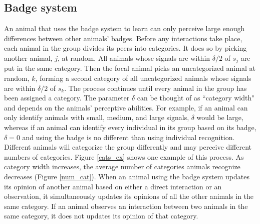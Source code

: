 \subsection{Badge system }
An animal that uses the badge system to learn can only perceive large enough differences between other animals' badges. Before any interactions take place, each animal in the group divides its peers into categories. It does so by picking another animal, $j$, at random. All animals whose signals are within $\delta/2$ of $s_j$ are put in the same category. Then the focal animal picks an uncategorized animal at random, $k$, forming a second category of all uncategorized animals whose signals are within $\delta/2$ of $s_k$. The process continues until every animal in the group has been assigned a category. The parameter $\delta$ can be thought of as ``category width" and depends on the animals' perceptive abilities. For example, if an animal can only identify animals with small, medium, and large signals, $\delta$ would be large, whereas if an animal can identify every individual in its group based on its badge, $\delta=0$ and using the badge is no different than using individual recognition. Different animals will categorize the group differently and may perceive different numbers of categories. Figure \ref{cats_ex} shows one example of this process. 
As category width increases, the average number of categories animals recognize decreases (Figure \ref{num_cat}). When an animal using the badge system updates its opinion of another animal based on either a direct interaction or an observation, it simultaneously updates its opinions of all the other animals in the same category. If an animal observes an interaction between two animals in the same category, it does not updates its opinion of that category.

